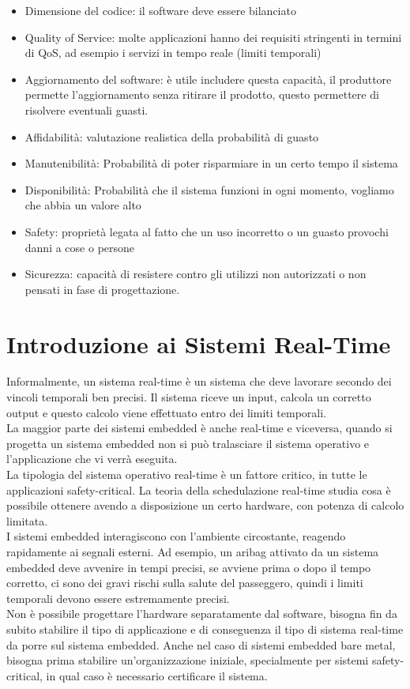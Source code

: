 \documentclass[12pt, oneside]{extbook}
\begin{document}
\begin{itemize}
\item Dimensione del codice: il software deve essere bilanciato
\item Quality of Service: molte applicazioni hanno dei requisiti stringenti in termini di QoS, ad esempio i servizi in tempo reale (limiti temporali)
\item Aggiornamento del software: è utile includere questa capacità, il produttore permette l'aggiornamento senza ritirare il prodotto, questo permettere di risolvere eventuali guasti.
\item Affidabilità: valutazione realistica della probabilità di guasto
\item Manutenibilità: Probabilità di poter risparmiare in un certo tempo il sistema
\item Disponibilità: Probabilità che il sistema funzioni in ogni momento, vogliamo che abbia un valore alto
\item Safety: proprietà legata al fatto che un uso incorretto o un guasto provochi danni a cose o persone
\item Sicurezza: capacità di resistere contro gli utilizzi non autorizzati o non pensati in fase di progettazione. 
\end{itemize}
\section{Introduzione ai Sistemi Real-Time}
Informalmente, un sistema real-time è un sistema che deve lavorare secondo dei vincoli temporali ben precisi. Il sistema riceve un input, calcola un corretto output e questo calcolo viene effettuato entro dei limiti temporali.\\ La maggior parte dei sistemi embedded è anche real-time e viceversa, quando si progetta un sistema embedded non si può tralasciare il sistema operativo e l'applicazione che vi verrà eseguita.\\ La tipologia del sistema operativo real-time è un fattore critico, in tutte le applicazioni safety-critical. La teoria della schedulazione real-time studia cosa è possibile ottenere avendo a disposizione un certo hardware, con potenza di calcolo limitata.\\ I sistemi embedded interagiscono con l'ambiente circostante, reagendo rapidamente ai segnali esterni. Ad esempio, un aribag attivato da un sistema embedded deve avvenire in tempi precisi, se avviene prima o dopo il tempo corretto, ci sono dei gravi rischi sulla salute del passeggero, quindi i limiti temporali devono essere estremamente precisi.\\ Non è possibile progettare l'hardware separatamente dal software, bisogna fin da subito stabilire il tipo di applicazione e di conseguenza il tipo di sistema real-time da porre sul sistema embedded. Anche nel caso di sistemi embedded bare metal, bisogna prima stabilire un'organizzazione iniziale, specialmente per sistemi safety-critical, in qual caso è necessario certificare il sistema.
\end{document}
